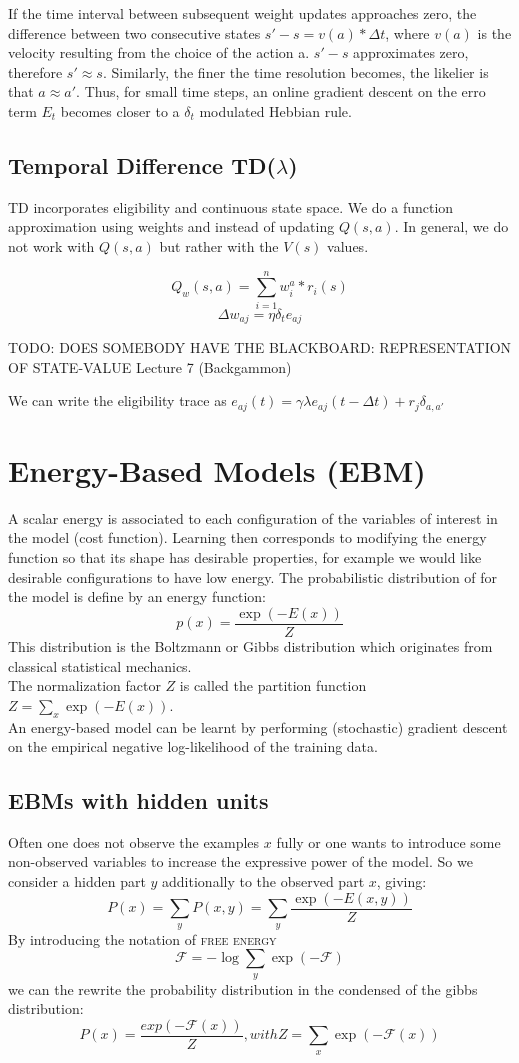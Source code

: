 \documentclass[11pt]{article}
\begin{document}
If the time interval between subsequent weight updates approaches zero, the difference between two consecutive states $s' - s = v(a) * \Delta t$, where $v(a)$ is the velocity resulting from the choice of the action a. $s'-s$ approximates zero, therefore $s' \approx s$. Similarly, the finer the time resolution becomes, the likelier is that $a \approx a'$. Thus, for small time steps, an online gradient descent on the erro term $E_t$ becomes closer to a $\delta_t$ modulated Hebbian rule. 

\subsection{Temporal Difference TD($\lambda$)}
TD incorporates eligibility and continuous state space. We do a function approximation using weights and instead of updating $Q(s,a)$. In general, we do not work with $Q(s,a)$ but rather with the $V(s)$ values.

\[
	Q_w(s,a) = \sum_{i=1}^n w_i^a * r_i(s)
\]
\[
	\Delta w_{aj} = \eta \delta_t e_{aj}
\]

TODO: DOES SOMEBODY HAVE THE BLACKBOARD: REPRESENTATION OF STATE-VALUE Lecture 7 (Backgammon)

We can write the eligibility trace as $e_{aj}(t) = \gamma \lambda e_{aj}(t-\Delta t) + r_j\delta_{a,a'}$

\section{Energy-Based Models (EBM)}
A scalar energy is associated to each configuration of the variables of interest in the model (cost function). Learning then corresponds to modifying the energy function so that its shape has desirable properties, for example we would like desirable configurations to have low energy. The probabilistic distribution of for the model is define by an energy function:
\[
	p(x)=\frac{\exp(-E(x))}{Z}
\]
This distribution is the Boltzmann or Gibbs distribution which originates from classical statistical mechanics.\\
The normalization factor $Z$ is called the partition function $Z=\sum_x \exp(-E(x))$.\\
An energy-based model can be learnt by performing (stochastic) gradient descent on the empirical negative log-likelihood of the training data.

\subsection{EBMs with hidden units}
Often one does not observe the examples $x$ fully or one wants to introduce some non-observed variables to increase the expressive power of the model. So we consider a hidden part $y$ additionally to the observed part $x$, giving:
\[ 
	P(x) = \sum_y P(x,y) = \sum_y \frac{\exp(-E(x,y))}{Z}
\]
By introducing the notation of \textsc{free energy}
\[
	\mathcal{F}= -\log\sum_y \exp(-\mathcal{F})
\]
we can the rewrite the probability distribution in the condensed of the gibbs distribution:
\[
	P(x)=\frac{exp(-\mathcal{F}(x))}{Z}, with Z=\sum_x \exp(-\mathcal{F}(x))
\]
\end{document}
